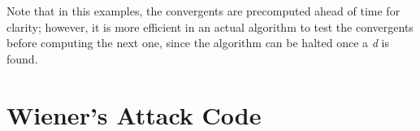 \documentclass[11pt]{article}
\begin{document}
\begin{appendices}
Note that in this examples, the convergents are precomputed ahead of time for clarity; however, it is more efficient in an actual algorithm to test the convergents before computing the next one, since the algorithm can be halted once a \emph{d} is found.

\section{Wiener's Attack Code}

\end{appendices}

\medskip



\end{document}
